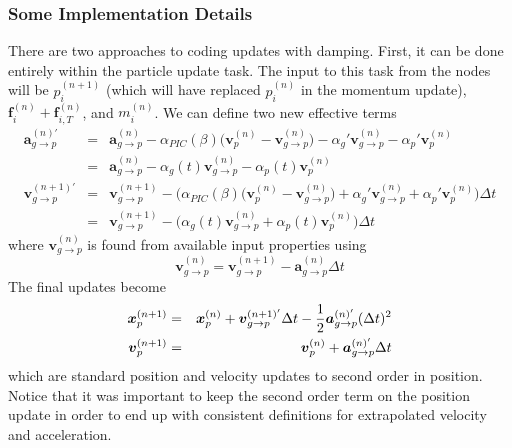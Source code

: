 \documentclass[11pt]{article}
\renewcommand{\vec}[1]{\boldsymbol{#1}}
\begin{document}
\subsubsection{Some Implementation Details}

There are two approaches to coding updates with damping. First, it can be done entirely within the particle update task. The input to this task from  the nodes will be $p_i^{(n+1)}$ (which will have replaced $p_i^{(n)}$ in the momentum update), $ \vec f_{i}^{(n)} + \vec f_{i,T}^{(n)}$, and  $m_i^{(n)}$. We can define two new effective terms
\begin{eqnarray}
    \vec{a}_{g\to p}^{(n)'} & = &  \vec{a}_{g\to p}^{(n)} - \alpha_{PIC}(\beta)\bigl(\vec v_p^{(n)}-\vec v_{g\to p}^{(n)}\bigr)
         -  \alpha_g'\vec{v}_{g\to p}^{(n)} -  \alpha_p'\vec{v}_p^{(n)} \\
         & = & \vec{a}_{g\to p}^{(n)} -  \alpha_g(t)\vec{v}_{g\to p}^{(n)} -  \alpha_p(t)\vec{v}_p^{(n)}  \\
    \vec v_{g\to p}^{(n+1)'} & = & \vec v_{g\to p}^{(n+1)} - \biggl(\alpha_{PIC}(\beta)\bigl(\vec v_p^{(n)}-\vec v_{g\to p}^{(n)}\bigr)
         +  \alpha_g'\vec{v}_{g\to p}^{(n)} + \alpha_p'\vec{v}_p^{(n)}\biggr)\Delta t \\
         & = & \vec v_{g\to p}^{(n+1)} - \biggl( \alpha_g(t)\vec{v}_{g\to p}^{(n)} + \alpha_p(t)\vec{v}_p^{(n)}\biggr)\Delta t
\end{eqnarray}
where $\vec v_{g\to p}^{(n)}$ is found from available input properties using
\begin{equation}
 \vec v_{g\to p}^{(n)}  =  \vec v_{g\to p}^{(n+1)}  - \vec{a}_{g\to p}^{(n)}\Delta t
\end{equation}
The final updates become
\begin{eqnarray}
   \vec{x}_{p}^{(n+1)} & = & \vec{x}_p^{(n)} +\vec v_{g\to p}^{(n+1)'}\Delta t - {1\over 2}\vec{a}_{g\to p}^{(n)'}(\Delta t)^2  \\
   \vec{v}_{p}^{(n+1)} & = & \vec{v}_p^{(n)} + \vec{a}_{g\to p}^{(n)'}\Delta t 
\end{eqnarray}
which are standard position and velocity updates to second order in position. Notice that it was important to keep the second order term on the position update in order to end up with consistent definitions for extrapolated velocity and acceleration.
\end{document}
